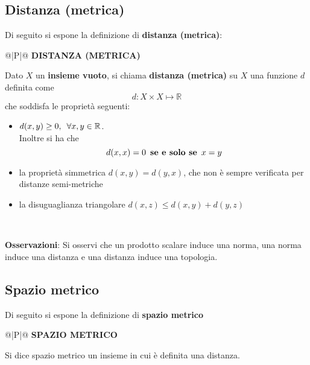 \documentclass[a4paper]{extarticle}
\renewcommand\arraystretch{}
\begin{document}
\vspace{1em}
\noindent
\subsection{Distanza (metrica)}
Di seguito si espone la definizione di \textbf{distanza (metrica)}:

\vspace{1em}
\setlength{\tabcolsep}{14pt}
\renewcommand{\arraystretch}{2}
\noindent
\begin{tabularx}{\textwidth}{@{}|P|@{}}
    \hline
    {\textbf{DISTANZA (METRICA)}}\\
    \parbox{\linewidth}{Dato $X$ un \textbf{insieme vuoto}, si chiama \textbf{distanza (metrica)} su $X$ una funzione $d$ definita come
    \[d : X \times X \longmapsto \mathbb{R}\]
    che soddisfa le proprietà seguenti:
    \begin{itemize}
        \item $d(x,y) \geq 0, \hspace{0.5em} \forall x, y \in \mathbb{R}$.\\
        Inoltre si ha che
        \[d(x,x) = 0 \hspace{0.5em} \textbf{se e solo se} \hspace{0.5em} x=y\]
        \item la proprietà simmetrica $d(x,y)=d(y,x)$, che non è sempre verificata per distanze semi-metriche
        \item la disuguaglianza triangolare $d(x,z) \leq d(x,y) + d(y,z)$
    \end{itemize}
    \vspace{3mm}}\\
    \hline
\end{tabularx}

\vspace{2em}
\noindent
\textbf{Osservazioni}: Si osservi che un prodotto scalare induce una norma, una norma induce una distanza e una distanza induce una topologia.

\vspace{1em}
\noindent
\subsection{Spazio metrico}
Di seguito si espone la definizione di \textbf{spazio metrico}

\vspace{1em}
\setlength{\tabcolsep}{14pt}
\renewcommand{\arraystretch}{2}
\noindent
\begin{tabularx}{\textwidth}{@{}|P|@{}}
    \hline
    {\textbf{SPAZIO METRICO}}\\
    \parbox{\linewidth}{Si dice spazio metrico un insieme in cui è definita una distanza. \vspace{3mm}}\\
    \hline
\end{tabularx}
\end{document}

